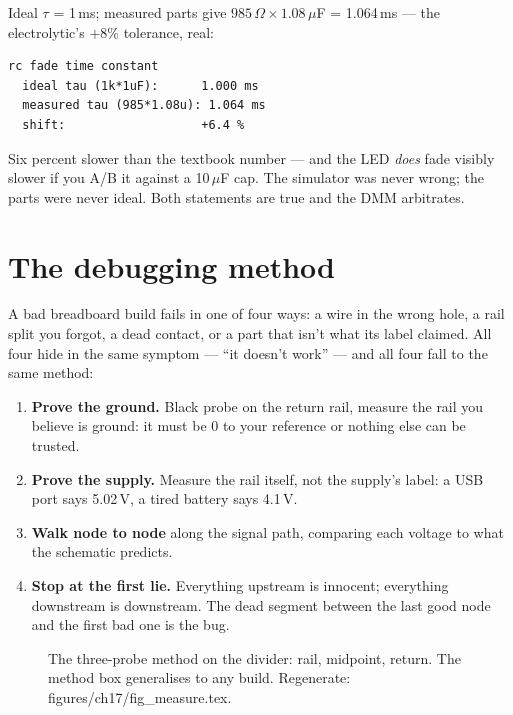 \begin{example}
Ideal $\tau$ = 1\,ms; measured parts give $985\,\Omega \times
1.08\,\mu$F = 1.064\,ms --- the electrolytic's $+8\%$ tolerance, real:

\begin{lstlisting}[caption={\ttfamily ch17\_rc\_fade\_measured.cir +
compare.py --- the measured-value sim.}]
rc fade time constant
  ideal tau (1k*1uF):      1.000 ms
  measured tau (985*1.08u): 1.064 ms
  shift:                   +6.4 %
\end{lstlisting}

Six percent slower than the textbook number --- and the LED
\emph{does} fade visibly slower if you A/B it against a 10\,$\mu$F
cap. The simulator was never wrong; the parts were never ideal.
Both statements are true and the DMM arbitrates.
\end{example}

\section{The debugging method}\label{sec:dmm17}

A bad breadboard build fails in one of four ways: a wire in the
wrong hole, a rail split you forgot, a dead contact, or a part that
isn't what its label claimed. All four hide in the same symptom ---
``it doesn't work'' --- and all four fall to the same method:

\begin{enumerate}
\item \textbf{Prove the ground.} Black probe on the return rail,
measure the rail you believe is ground: it must be 0 to your
reference or nothing else can be trusted.
\item \textbf{Prove the supply.} Measure the rail itself, not the
supply's label: a USB port says 5.02\,V, a tired battery says 4.1\,V.
\item \textbf{Walk node to node} along the signal path, comparing
each voltage to what the schematic predicts.
\item \textbf{Stop at the first lie.} Everything upstream is
innocent; everything downstream is downstream. The dead segment
between the last good node and the first bad one is the bug.
\end{enumerate}

\begin{figure}[htbp]
\centering

\caption{The three-probe method on the divider: rail, midpoint,
return. The method box generalises to any build. Regenerate:
\ttfamily figures/ch17/fig\_measure.tex.}
\label{fig:measure17}
\end{figure}

